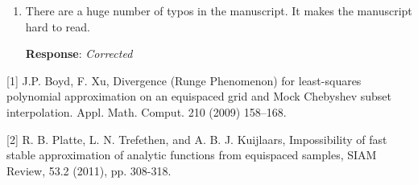 \documentclass[11pt]{article}
\newcommand{\Response}{{\bf Response}}
\begin{document}
\begin{enumerate}
* The U and V in Alg 2 are used for both the Phi and $exp^{2\pi i\Phi}$. 

* What values are you thinking about for tau in Alg 4?

* Step 5 of Alg 6 selects n so that one expects that it is a lower bound on the numerical rank of $(U_2V_2^*).*exp^{2\pi i(U_1V_1^*-PQ^*}$. Do you need to assume that $n\leq r_{\epsilon}$? 

\Response: {\it  1) No, $O(r)$ is not exactly $rq$ because in Line 6 in ALg 1 we mentioned that Line 4 and 5 may be repeated for a few times. For example, the union of $S_{row}$ and $\Pi_{row}$ may generate more than $rq$ selected rows in the QR factorization.

2) You're right. Corrected.

3) Answered in the previous answer.

4) Yes, we expect that $n\leq r_\epsilon$. This is not an assumption, but a natural requirement due to the current development of NUFFT, since there is no NUFFT with higher than $3$D available. Higher dimensional NUFFT could be an interesting future work. Hence, $n\leq r$ and $r\leq 3$. $r_\epsilon$ can be as large as $O(100)$. There might be no computational meaning for clarifying $n\leq r_\epsilon$ since $r$ and $r_\epsilon$ are two independent parameters. If a very high dimensional NUFFT is available, $n>r_\epsilon$ might not be a bad idea. Hence, we didn't mention the relation of $n$ and $r_\epsilon$. We have commented the size of $r$ right after Algorithm 6.
}

\item There are a huge number of typos in the manuscript. It makes the manuscript hard to read.

\Response: {\it Corrected}

\end{enumerate}


[1] J.P. Boyd, F. Xu, Divergence (Runge Phenomenon) for least-squares polynomial approximation on an equispaced grid and Mock Chebyshev subset interpolation. Appl. Math. Comput. 210 (2009) 158–168.

[2] R. B. Platte, L. N. Trefethen, and A. B. J. Kuijlaars, Impossibility of fast stable approximation of analytic functions from equispaced samples, SIAM Review, 53.2 (2011), pp. 308-318.
\end{document}
